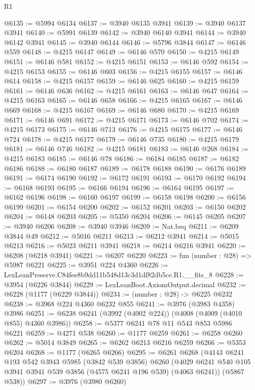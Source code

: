 \begin{lexlean}{R1}
\begin{coremodule}
@6135 := @5994 @6134
@6137 := @3940 @6135 @3941
@6139 := @3940 @6137 @3941
@6140 := @5991 @6139
@6142 := @3940 @6140 @3941
@6144 := @3940 @6142 @3941
@6145 := @3940 @6144
@6146 := @5796 @3844
@6147 := @6146 @559
@6148 := @4215 @6147
@6149 := @6146 @570
@6150 := @4215 @6149
@6151 := @6146 @581
@6152 := @4215 @6151
@6153 := @6146 @592
@6154 := @4215 @6153
@6155 := @6146 @603
@6156 := @4215 @6155
@6157 := @6146 @614
@6158 := @4215 @6157
@6159 := @6146 @625
@6160 := @4215 @6159
@6161 := @6146 @636
@6162 := @4215 @6161
@6163 := @6146 @647
@6164 := @4215 @6163
@6165 := @6146 @658
@6166 := @4215 @6165
@6167 := @6146 @669
@6168 := @4215 @6167
@6169 := @6146 @680
@6170 := @4215 @6169
@6171 := @6146 @691
@6172 := @4215 @6171
@6173 := @6146 @702
@6174 := @4215 @6173
@6175 := @6146 @713
@6176 := @4215 @6175
@6177 := @6146 @724
@6178 := @4215 @6177
@6179 := @6146 @735
@6180 := @4215 @6179
@6181 := @6146 @746
@6182 := @4215 @6181
@6183 := @6146 @268
@6184 := @4215 @6183
@6185 := @6146 @78
@6186 := @6184 @6185
@6187 := @6182 @6186
@6188 := @6180 @6187
@6189 := @6178 @6188
@6190 := @6176 @6189
@6191 := @6174 @6190
@6192 := @6172 @6191
@6193 := @6170 @6192
@6194 := @6168 @6193
@6195 := @6166 @6194
@6196 := @6164 @6195
@6197 := @6162 @6196
@6198 := @6160 @6197
@6199 := @6158 @6198
@6200 := @6156 @6199
@6201 := @6154 @6200
@6202 := @6152 @6201
@6203 := @6150 @6202
@6204 := @6148 @6203
@6205 := @5350 @6204
@6206 := @6145 @6205
@6207 := @3940 @6206
@6208 := @3940 @3946
@6209 := Nat.beq
@6211 := @6209 @3844 @49
@6212 := @5016 @6211
@6213 := @6212 @3941
@6214 := @5015 @6213
@6216 := @5023 @6211 @3941
@6218 := @6214 @6216 @3941
@6220 := @6208 (@6218 @3941)
@6221 := @6207 @6220
@6223 := fun (number : @28) => @5987 @6221
@6225 := @3951 @224 @4360
@6226 := LexLeanPreserve.C84fee8b9dd11b548d13c3d1df82db5ce.R1.__fits_8
@6228 := @3954 (@6226 @3844)
@6229 := LexLeanBoot.AxiomOutput.decimal
@6232 := @6228 (@1177 (@6229 @3844))
@6234 := (number : @28) -> @6225 @6232
@6238 := @3968 @224 @4360 @6232 @855
@6241 := @3976 (@3983 @4358) @3986
@6251 := @6238 @6241 (@3992 (@4002 @224)) (@4008 (@4009 (@4010 @855) @4360 @3986))
@6258 := @5377 @6241 @78 @11 @543 @853 @5986 @6221
@6259 := @4271 @538
@6260 := @1177 @6259
@6261 := @6258 @6260
@6262 := @5014 @3849
@6265 := @6262 @6213 @6216 @6259
@6266 := @5353 @6204
@6268 := @1177 (@6265 @6266)
@6295 := @6261
    @6268
    (@4143
      @6241
      @193
      @542
      @3943
      @5985
      (@3842 @539 @3856)
      @6260
      (@4029 @6241 @540 @105 @3941 @3941 @539 @3856 (@4575 @6241 @196 @539) (@4063 @6241))
      (@5867 @538))
@6297 := @3976 (@3980 @6260)

\end{coremodule}
\end{lexlean}
